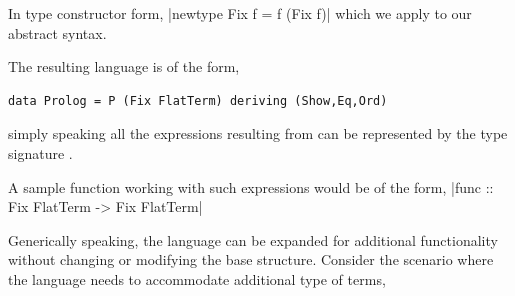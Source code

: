 \documentclass[thesis-solanki.tex]{subfiles}
\begin{document}
In type constructor form,
|newtype Fix f = f (Fix f)|
which we apply to our abstract syntax.


The resulting language is of the form,
\begin{verbatim}
data Prolog = P (Fix FlatTerm) deriving (Show,Eq,Ord)
\end{verbatim}
%
simply speaking all the expressions resulting from  can be represented  by the type signature .

A sample function working with such expressions would be of the form,
|func :: Fix FlatTerm -> Fix FlatTerm|


Generically speaking, the language can be expanded for additional functionality without changing or modifying the base structure. Consider
the scenario where the language needs to accommodate additional type of terms,
\end{document}

